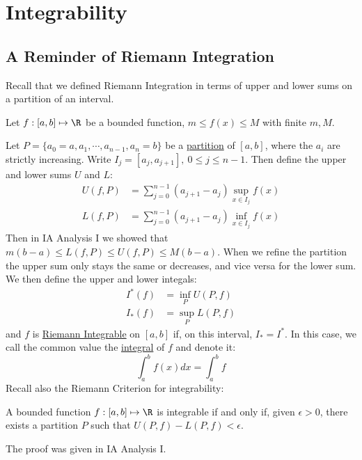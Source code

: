 \documentclass[../Main.tex]{subfiles}
\begin{document}
\section{Integrability}
\subsection{A Reminder of Riemann Integration}
Recall that we defined Riemann Integration in terms of upper and lower sums on a partition of an interval.

Let $f : [a, b] \mapsto \R$ be a bounded function, $m \leq f(x) \leq M$ with finite $m, M$.

Let $P = \{a_0 = a, a_1, \cdots, a_{n-1}, a_n = b\}$ be a \underline{partition} of $[a, b]$, where the $a_i$ are strictly increasing. Write $I_j = [a_j, a_{j+1}],~0 \leq j \leq n-1$. Then define the upper and lower sums $U$ and $L$:
\begin{align*}
    U(f, P) &= \sum_{j=0}^{n-1} (a_{j+1} - a_j) \sup_{x\in I_j} f(x) \\
    L(f, P) &= \sum_{j=0}^{n-1} (a_{j+1} - a_j) \inf_{x\in I_j} f(x)
\end{align*}
Then in IA Analysis I we showed that $m(b-a) \leq L(f, P) \leq U(f, P) \leq M(b-a)$. When we refine the partition the upper sum only stays the same or decreases, and vice versa for the lower sum. We then define the upper and lower integals:
\begin{align*}
    I^*(f) &= \inf_{P} U(P, f) \\
    I_*(f) &= \sup_{P} L(P, f)
\end{align*}
and $f$ is \underline{Riemann Integrable} on $[a, b]$ if, on this interval, $I_* = I^*$. In this case, we call the common value the \underline{integral} of $f$ and denote it:
\begin{equation*}
    \int_{a}^{b} f(x) dx = \int_a^b f
\end{equation*}
Recall also the Riemann Criterion for integrability:
\begin{theorem}
    A bounded function $f : [a, b] \mapsto \R$ is integrable if and only if, given $\epsilon > 0$, there exists a partition $P$ such that $U(P, f) - L(P, f) < \epsilon$.
    \label{thmRiemannCriterion}
\end{theorem}
The proof was given in IA Analysis I.
\end{document}
